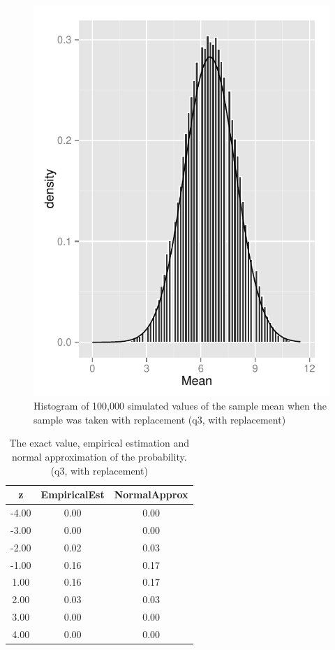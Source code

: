\documentclass[11pt]{article}
\begin{document}
 
\begin{figure}
\centering
\includegraphics{histogram_3c-1.pdf}
\caption{Histogram of 100,000 simulated values of the sample mean when the sample was taken with replacement (q3, with replacement)}\label{fig:q3c}
\end{figure}
 

\begin{table}[H]
\centering
\begin{tabular}{|c|cc|}
  \hline
z & EmpiricalEst & NormalApprox \\ 
  \hline
-4.00 & 0.00 & 0.00 \\ 
  -3.00 & 0.00 & 0.00 \\ 
  -2.00 & 0.02 & 0.03 \\ 
  -1.00 & 0.16 & 0.17 \\ 
  1.00 & 0.16 & 0.17 \\ 
  2.00 & 0.03 & 0.03 \\ 
  3.00 & 0.00 & 0.00 \\ 
  4.00 & 0.00 & 0.00 \\ 
   \hline
\end{tabular}
\caption{The exact value, empirical estimation and normal approximation of the probability.(q3, with replacement)} \label{tab:q3c}
\end{table}
\end{document}

